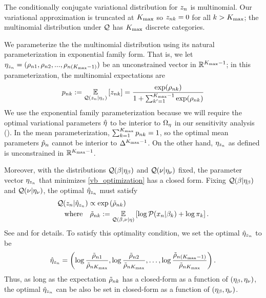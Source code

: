 
\begin{ex}
%
The conditionally conjugate variational distribution for $z_n$
is multinomial.
Our variational approximation is truncated at ${K_{\mathrm{max}}}$ so
$z_{nk} = 0$ for all $k > {K_{\mathrm{max}}}$;
the multinomial distribution under $\mathcal{Q}$ has ${K_{\mathrm{max}}}$ discrete categories.

We parameterize the the multinomial distribution
using its natural parameterization
in exponential family form. That is,
we let $\eta_{z_n} = (\rho_{n1}, \rho_{n2}, ..., \rho_{n({K_{\mathrm{max}}}-1)})$
be an unconstrained vector in $\mathbb{R}^{{K_{\mathrm{max}}}-1}$;
in this parameterization, the multinomial expectations are
%
\begin{align*}
  p_{nk} := \underset{\mathcal{Q}(z_n \vert \eta_{z})}{\mathbb{E}}\left[z_{nk}\right] =
  \frac{\exp(\rho_{nk})}{1 + \sum_{k'=1}^{{K_{\mathrm{max}}}-1}\exp(\rho_{nk})}
\end{align*}
%
We use the exponential family parameterization because
we will require the optimal variational parameters $\hat\eta$
to be interior to $\Omega_{\eta}$ in our sensitivity analysis
().
In the mean parameterization,
$\sum_{k=1}^{K_{\mathrm{max}}} p_{nk} = 1$, so the
optimal mean parameters $\hat p_{n}$ cannot be
interior to $\Delta^{{K_{\mathrm{max}}} - 1}$.
On the other hand, $\eta_{z_n}$ as defined
is unconstrained in $\mathbb{R}^{{K_{\mathrm{max}}} - 1}$.

Moreover, with the distributions $\mathcal{Q}(\beta\vert\eta_{\beta})$ and $\mathcal{Q}(\nu\vert\eta_{\nu})$ fixed,
the parameter vector $\eta_{z_n}$ that minimizes \eqref{vb_optimization}
has a closed form.
Fixing $\mathcal{Q}(\beta\vert\eta_{\beta})$ and $\mathcal{Q}(\nu\vert\eta_{\nu})$,
the optimal $\hat\eta_{z_n}$ must satisfy
%
\begin{align*}
& \mathcal{Q}(z_n | \hat\eta_{z_n}) \propto \exp\left(\tilde \rho_{nk}\right)\\
& \quad\textrm{where}\quad \tilde \rho_{nk} := \underset{\mathcal{Q}(\beta, \nu \vert \eta)}{\mathbb{E}}\left[\log \mathcal{P}(x_n \vert \beta_k) + \log \pi_k\right].
\end{align*}
%
See \citet{bishop:2006:PRML} and \citet{blei:2017:vi_review} for details.
To satisfy this optimality condition,
we set the optimal $\hat\eta_{z_n}$ to be
%
\begin{align*}
%
\etaopt_{\z_\n} = \left(\log\frac{\tilde\rho_{\n1}}{\tilde\rho_{\n\kmax}},
\log\frac{\tilde\rho_{\n2}}{\tilde\rho_{\n\kmax}}, \ldots,
\log\frac{\tilde\rho_{\n(\kmax-1)}}{\tilde\rho_{\n\kmax}}\right).
%
\end{align*}
%
Thus, as long as the expectation $\tilde\rho_{nk}$ has a closed-form as a function of
$(\eta_{\beta}, \eta_{\nu})$, the optimal $\hat\eta_{z_n}$ can be also be set in closed-form as
a function of $(\eta_{\beta}, \eta_{\nu})$.
%
\end{ex}

